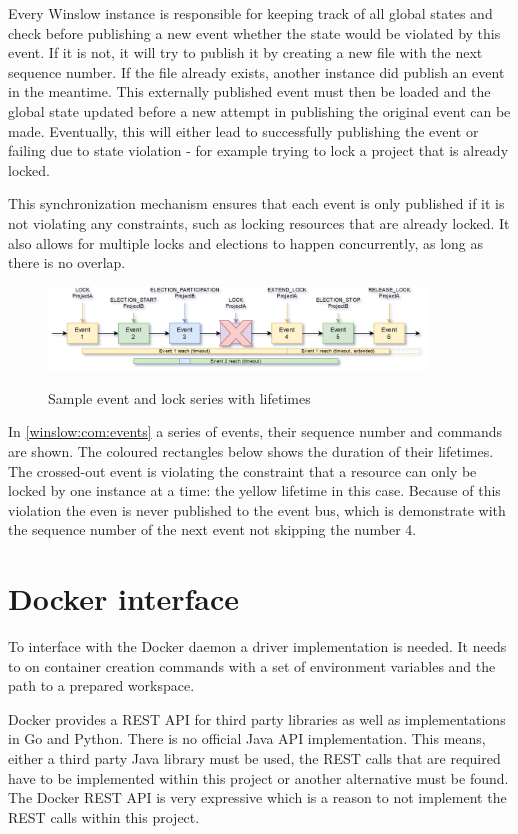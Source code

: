 Every Winslow instance is responsible for keeping track of all global states and check before publishing a new event whether the state would be violated by this event.
If it is not, it will try to publish it by creating a new file with the next sequence number.
If the file already exists, another instance did publish an event in the meantime.
This externally published event must then be loaded and the global state updated before a new attempt in publishing the original event can be made.
Eventually, this will either lead to successfully publishing the event or failing due to state violation - for example trying to lock a project that is already locked.


This synchronization mechanism ensures that each event is only published if it is not violating any constraints, such as locking resources that are already locked.
It also allows for multiple locks and elections to happen concurrently, as long as there is no overlap.

\begin{figure}[H]
	\centering
	\includegraphics[width=0.9\textwidth]{events.png}
	\label{winslow:com:events}
	\caption{Sample event and lock series with lifetimes}
\end{figure}

In \autoref{winslow:com:events} a series of events, their sequence number and commands are shown.
The coloured rectangles below shows the duration of their lifetimes.
The crossed-out event is violating the constraint that a resource can only be locked by one instance at a time: the yellow lifetime in this case.
Because of this violation the even is never published to the event bus, which is demonstrate with the sequence number of the next event not skipping the number 4.

\section{Docker interface}


To interface with the Docker daemon a driver implementation is needed.
It needs to on container creation commands with a set of environment variables and the path to a prepared workspace.

Docker provides a REST API\cite{docker:api} for third party libraries as well as implementations in Go and Python.
There is no official Java API implementation.
This means, either a third party Java library must be used, the REST calls that are required have to be implemented within this project or another alternative must be found.
The Docker REST API is very expressive which is a reason to not implement the REST calls within this project.

